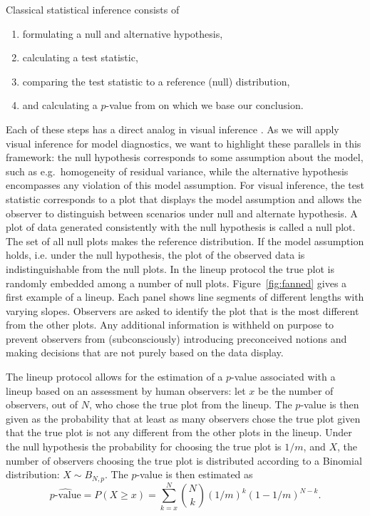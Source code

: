 \documentclass{article} %
\newcommand{\hh}[1]{{\color{orange} #1}}
\begin{document}
Classical statistical inference consists of 
\begin{enumerate}
	\item formulating a null and alternative hypothesis,
	\item calculating a test statistic,
	\item comparing the test statistic to a reference (null) distribution,
	\item and calculating a $p$-value from on which we base our conclusion.
\end{enumerate}
Each of these steps has a direct analog in visual inference \cite{Buja:2009hp}. As we will apply visual inference for model diagnostics, we want to highlight these parallels in this framework: the null  hypothesis corresponds to some assumption about the model, such as e.g.~homogeneity of residual variance,
while
the alternative hypothesis encompasses any violation of this model assumption. For visual inference, the test statistic corresponds to a plot  that displays the model assumption and allows the observer to distinguish between scenarios under null and alternate hypothesis. 
A plot of data generated consistently with the null hypothesis is called a null plot. The set of all null plots makes the reference distribution. 
If the model assumption holds, i.e.  under the null hypothesis, the plot of the observed data is indistinguishable from the null plots. 
In the lineup protocol the true plot is randomly embedded among a number of null plots.  
\hh{Figure~\ref{fig:fanned} gives a first example of a lineup. Each panel shows  line segments of different lengths  with varying slopes. 
Observers are asked to identify the plot that is the most different from the other plots.    Any additional information is  withheld on purpose to prevent observers from (subconsciously)  introducing preconceived notions and making decisions that are not purely based on the data display. 
}

The lineup protocol allows for the estimation of a $p$-value associated with a lineup
based on an assessment  by human observers: let $x$ be the number of observers, out of $N$, who chose the true plot from the lineup. The $p$-value is then given as the probability that at least as many observers chose the true plot given that the true plot is not any different from the other plots in the lineup. Under the null hypothesis the probability for choosing the true plot is $1/m$, and $X$, the number of observers choosing the true plot is distributed according to a Binomial distribution: $X \sim B_{N, p}$. The $p$-value is then estimated as
\begin{equation}\label{eqn.pvalue}
\widehat{p\text{-value}} = P(X \ge x) = \sum_{k= x}^N {N \choose k} \left(1/m\right)^k \left(1 - 1/m\right)^{N-k}.
\end{equation}
\end{document}
